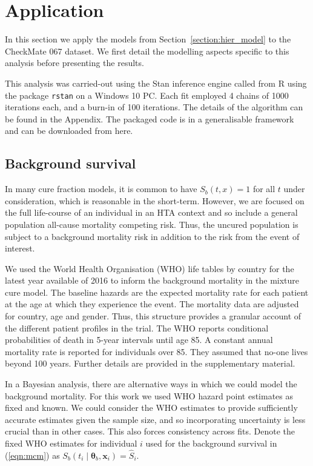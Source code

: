 \documentclass[AMA,STIX1COL]{WileyNJD-v2}
\begin{document}
%
\section{Application}\label{sec:application}
In this section we apply the models from Section~\ref{section:hier_model} to the CheckMate 067 dataset.
We first detail the modelling aspects specific to this analysis before presenting the results.

This analysis was carried-out using the Stan inference engine \cite{carpenter2017stan} called from R \cite{Rcoreteam} using the package \texttt{rstan} on a Windows 10 PC.
Each fit employed 4 chains of 1000 iterations each, and a burn-in of 100 iterations.
The details of the algorithm can be found in the Appendix.
The packaged code is in a generalisable framework and can be downloaded from here.

%
\subsection{Background survival}
In many cure fraction models, it is common to have $S_b(t, x) = 1$ for all $t$ under consideration, which is reasonable in the short-term.
However, we are focused on the full life-course of an individual in an HTA context and so include a general population all-cause mortality competing risk.
Thus, the uncured population is subject to a background mortality risk in addition to the risk from the event of interest.

We used the World Health Organisation (WHO) life tables by country for the latest year available of 2016 \cite{wholifetables} to inform the background mortality in the mixture cure model.
The baseline hazards are the expected mortality rate for each patient at the age at which they experience the event.
The mortality data are adjusted for country, age and gender. Thus, this structure provides a granular account of the different patient profiles in the trial.
The WHO reports conditional probabilities of death in 5-year intervals until age 85.
A constant annual mortality rate is reported for individuals over 85. They assumed that no-one lives beyond 100 years.
Further details are provided in the supplementary material.

In a Bayesian analysis, there are alternative ways in which we could model the background mortality.
For this work we used WHO hazard point estimates as fixed and known.
We could consider the WHO estimates to provide sufficiently accurate estimates given the sample size, and so incorporating uncertainty is less crucial than in other cases. This also forces consistency across fits.
Denote the fixed WHO estimates for individual $i$ used for the background survival in (\ref{eqn:mcm}) as
$S_b(t_i \mid \bm\theta_b, \bm{x}_i) = \hat{S}_i$.
\end{document}
